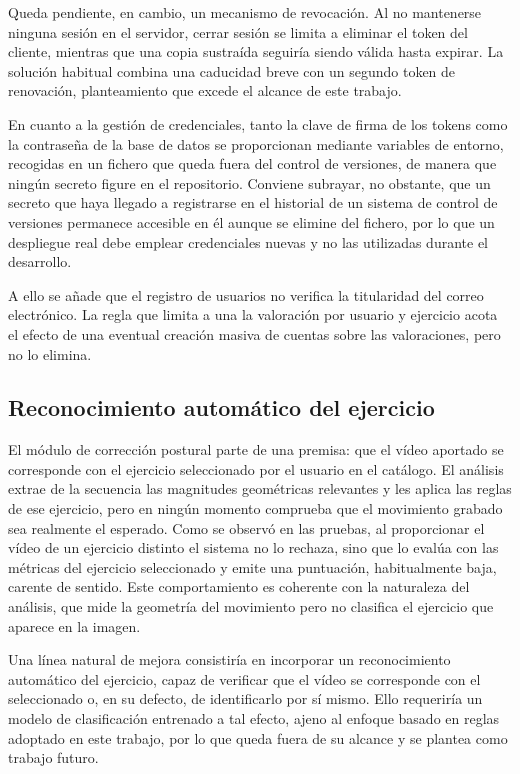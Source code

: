 \documentclass[12pt,a4paper,twoside,openright]{book}
\begin{document}
    Queda pendiente, en cambio, un mecanismo de revocación. Al no mantenerse
    ninguna sesión en el servidor, cerrar sesión se limita a eliminar el token
    del cliente, mientras que una copia sustraída seguiría siendo válida hasta
    expirar. La solución habitual combina una caducidad breve con un segundo
    token de renovación, planteamiento que excede el alcance de este trabajo.

    En cuanto a la gestión de credenciales, tanto la clave de firma de los
    tokens como la contraseña de la base de datos se proporcionan mediante
    variables de entorno, recogidas en un fichero que queda fuera del control de
    versiones, de manera que ningún secreto figure en el repositorio. Conviene
    subrayar, no obstante, que un secreto que haya llegado a registrarse en el
    historial de un sistema de control de versiones permanece accesible en él
    aunque se elimine del fichero, por lo que un despliegue real debe emplear
    credenciales nuevas y no las utilizadas durante el desarrollo.

    A ello se añade que el registro de usuarios no verifica la titularidad del
    correo electrónico. La regla que limita a una la valoración por usuario y
    ejercicio acota el efecto de una eventual creación masiva de cuentas sobre
    las valoraciones, pero no lo elimina.

    \subsection{Reconocimiento automático del ejercicio}

    El módulo de corrección postural parte de una premisa: que el vídeo aportado
    se corresponde con el ejercicio seleccionado por el usuario en el catálogo.
    El análisis extrae de la secuencia las magnitudes geométricas relevantes y
    les aplica las reglas de ese ejercicio, pero en ningún momento comprueba que
    el movimiento grabado sea realmente el esperado. Como se observó en las
    pruebas, al proporcionar el vídeo de un ejercicio distinto el sistema no lo
    rechaza, sino que lo evalúa con las métricas del ejercicio seleccionado y
    emite una puntuación, habitualmente baja, carente de sentido. Este
    comportamiento es coherente con la naturaleza del análisis, que mide la
    geometría del movimiento pero no clasifica el ejercicio que aparece en la
    imagen.

    Una línea natural de mejora consistiría en incorporar un reconocimiento
    automático del ejercicio, capaz de verificar que el vídeo se corresponde con
    el seleccionado o, en su defecto, de identificarlo por sí mismo. Ello
    requeriría un modelo de clasificación entrenado a tal efecto, ajeno al
    enfoque basado en reglas adoptado en este trabajo, por lo que queda fuera de
    su alcance y se plantea como trabajo futuro.
\end{document}
